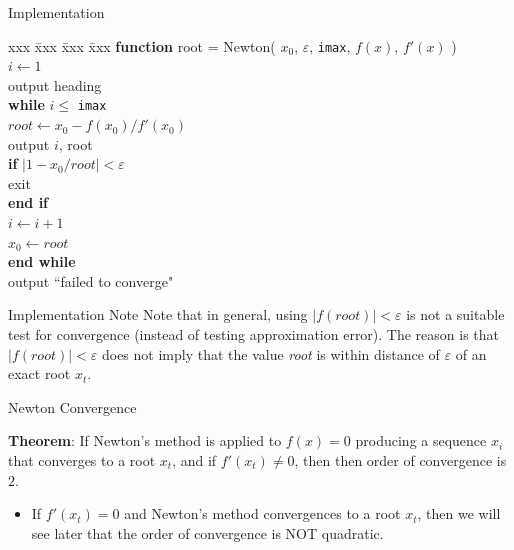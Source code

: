 \documentclass[12pt]{beamer}
\begin{document}
\begin{frame}{Implementation}

\begin{tabbing}
  xxx \= xxx \= xxx \= xxx \kill
\> \textbf{function} root = Newton( $x_0$, $\varepsilon$, \texttt{imax},  $f(x)$, $f'(x)$ ) \\
\> $i \leftarrow 1$ \\
\> output heading \\
\> \textbf{while} $i \le $ \texttt{imax} \\
\> \> $root \leftarrow x_0 - f(x_0)/f'(x_0)$ \\
\> \> output $i$, root \\
\> \> \textbf{if} $|1-x_0/root| < \varepsilon$ \\
\> \> \> exit \\
\> \> \textbf{end if} \\
\> \> $i \leftarrow i + 1$ \\
\> \> $x_0 \leftarrow root$ \\
\> \textbf{end while} \\
\> output ``failed to converge"
\end{tabbing}
\end{frame} 

\begin{frame}{Implementation Note}
Note that in general, using $|f(root)| < \varepsilon$ is not a suitable
test for convergence (instead of testing approximation error). The
reason is that $|f(root)| < \varepsilon$ does not imply that the value
{\it root} is within distance of $\varepsilon$ of an exact root $x_t$. 
\end{frame}



\begin{frame}{Newton Convergence} 

{\bf Theorem}: If Newton's method is applied to $f(x) = 0$ producing 
a sequence $x_i$ that converges to a root $x_t$, and if $f'(x_t) \neq 0$, then 
then order of convergence is $2$. 
\begin{itemize}
\item{If $f'(x_t) = 0$ and Newton's method convergences to a root $x_t$, then we will see later that the order of convergence is NOT quadratic.}
\end{itemize} 

\end{frame} 
\end{document}
